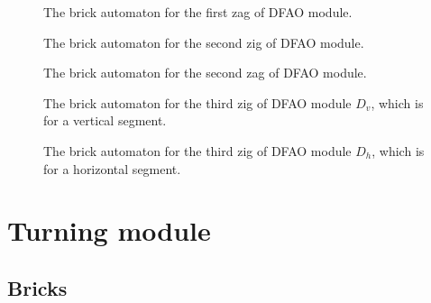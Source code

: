 \documentclass[runningheads]{llncs}
\begin{document}
\begin{figure}[ht]
\centering
\caption{The brick automaton for the first zag of DFAO module.}
\label{fig:brick_automaton_Dzag1}
\end{figure}

\begin{figure}[ht]
\centering
\caption{The brick automaton for the second zig of DFAO module.}
\label{fig:brick_automaton_Dzig2}
\end{figure}

\begin{figure}[ht]
\centering
\caption{The brick automaton for the second zag of DFAO module.}
\label{fig:brick_automaton_Dzag2}
\end{figure}

\begin{figure}[ht]
\centering
\caption{The brick automaton for the third zig of DFAO module $D_v$, which is for a vertical segment.}
\label{fig:brick_automaton_Dzig3}
\end{figure}

\begin{figure}[ht]
\centering
\caption{The brick automaton for the third zig of DFAO module $D_h$, which is for a horizontal segment.}
\label{fig:brick_automaton_Dzig3_hori}
\end{figure}

\clearpage

	\section{Turning module}
	\label{ap_sect:Turner_module}

	\subsection{Bricks}
	\label{ap_subsect:Turner_module_bricks}
\end{document}
